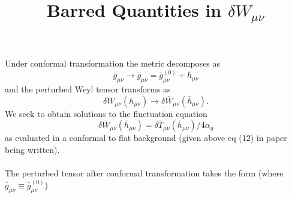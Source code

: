 \documentclass[10pt,letterpaper]{article}
\title{Barred Quantities in $\delta W_{\mu\nu}$}
\date{}
\newcommand{\be}{\begin{equation}} %
\newcommand{\ee}{\end{equation}} %
\begin{document}
\maketitle
\noindent
Under conformal transformation the metric decomposes as
\be
	g_{\mu\nu} \to \bar g_{\mu\nu} = \bar g_{\mu\nu}^{(0)} + \bar h_{\mu\nu}
\ee
and the perturbed Weyl tensor transforms as
\be
	\delta W_{\mu\nu}(h_{\mu\nu}) \to \delta \bar W_{\mu\nu}(\bar h_{\mu\nu}).
\ee
We seek to obtain solutions to the fluctuation equation 
\be
	\delta\bar W_{\mu\nu}(\bar h_{\mu\nu}) = \delta \bar T_{\mu\nu}(\bar h_{\mu\nu})/4\alpha_g
\ee
as evaluated in a conformal to flat background (given above eq (12) in paper being written).\\ \\
The perturbed tensor after conformal transformation takes the form (where $\bar g_{\mu\nu} \equiv \bar g_{\mu\nu}^{(0)}$)
\end{document}
